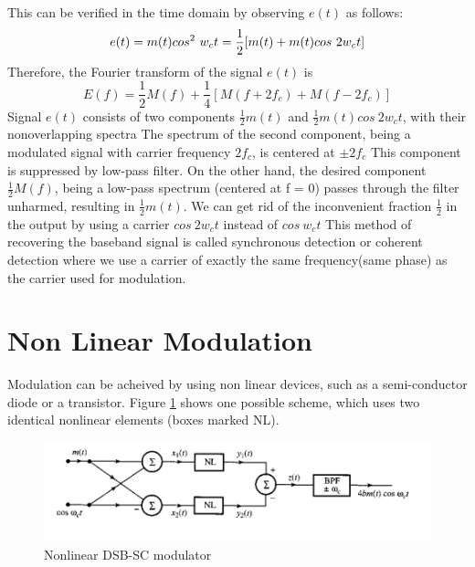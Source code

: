 This can be verified in the time domain by observing $e(t)$
as follows:
\begin{equation}
  e(t) = m(t)cos^2~w_ct\\
      = \frac{1}{2}[m(t)+m(t)cos~2w_ct]
\end{equation}
Therefore, the Fourier transform of the signal $e(t)$ is
\begin{equation}
   E(f) = \frac{1}{2}M(f) + \frac{1}{4}[M(f +2f_c)+M(f-2f_c)]
\end{equation}
Signal $e(t)$ consists of two components $\frac{1}{2}m(t)$ and $\frac{1}{2}m(t)cos~2w_ct$, with their nonoverlapping spectra
The spectrum of the second component, being a
modulated signal with carrier frequency $2f_c$, is centered at $\pm 2f_c$
This component is suppressed by low-pass filter. On the other hand, the desired component $\frac{1}{2}M(f)$, being a low-pass spectrum (centered at f = 0) passes through the filter unharmed, resulting in $\frac{1}{2}m(t)$. We can get rid  of the inconvenient fraction $\frac{1}{2}$ in the output by using a carrier $cos~2w_ct$ instead of $cos~w_ct$
This method of recovering the baseband signal is called synchronous detection or coherent detection where we
use a carrier of exactly the same frequency(same phase) as the carrier used for modulation.

\section{Non Linear Modulation}
Modulation can be acheived by using non linear devices, such as a semi-conductor diode or a transistor. Figure \ref{fig:Nonlinear} shows one possible scheme, which uses two identical nonlinear elements (boxes marked NL).
\begin{figure}[h!]
  \includegraphics[width = 1\textwidth]{figures/NonLinear.png}
  \caption{Nonlinear DSB-SC modulator}
  \label{fig:Nonlinear}
\end{figure}


